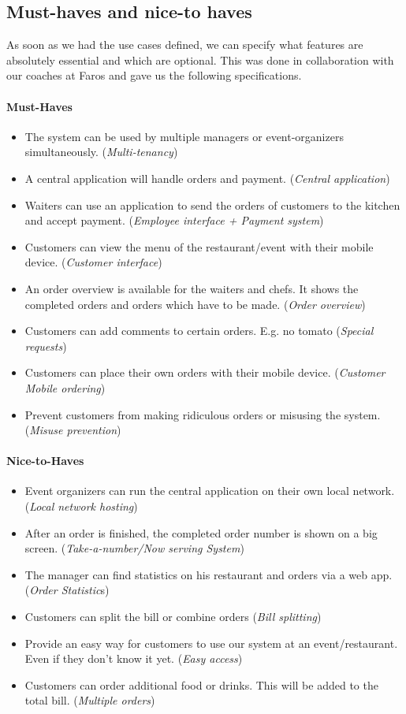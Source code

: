 \documentclass[12pt]{article}
\begin{document}
\begin{multicols}{2}
\label{sec:musthaves}
\subsection{Must-haves and nice-to haves}
As soon as we had the use cases defined, we can specify what features are absolutely essential and which are optional. This was done in collaboration with our coaches at Faros and gave us the following specifications.
\paragraph{Must-Haves}
\begin{itemize}
	\raggedright
	\item The system can be used by multiple managers or event-organizers simultaneously. 
	(\textit{Multi-tenancy})
	\item A central application will handle orders and payment. 
	(\textit{Central application})
	\item Waiters can use an application to send the orders of customers to the kitchen and accept payment. 
	(\textit{Employee interface + Payment system})
	\item Customers can view the menu of the restaurant/event with their mobile device. 
	(\textit{Customer interface})
	\item An order overview is available for the waiters and chefs. It shows the completed orders and orders which have to be made. 
	(\textit{Order overview})
	\item Customers can add comments to certain orders. E.g. no tomato
	(\textit{Special requests}) 
	\item Customers can place their own orders with their mobile device. 
	(\textit{Customer Mobile ordering})
	\item Prevent customers from making ridiculous orders or misusing the system.
	(\textit{Misuse prevention})
\end{itemize}
\paragraph{Nice-to-Haves}
\begin{itemize}
	\raggedright
	\item Event organizers can run the central application on their own local network. 
	(\textit{Local network hosting})
	\item After an order is finished, the completed order number is shown on a big screen. 
	(\textit{Take-a-number/Now serving System})
	\item The manager can find statistics on his restaurant and orders via a web app. 
	(\textit{Order Statistic}s)
	\item Customers can split the bill or combine orders 
	(\textit{Bill splitting})
	\item Provide an easy way for customers to use our system at an event/restaurant. Even if they don’t know it yet. 
	(\textit{Easy access})
	\item Customers can order additional food or drinks. This will be added to the total bill.
	(\textit{Multiple orders})
\end{itemize}


\end{multicols}
\end{document}

